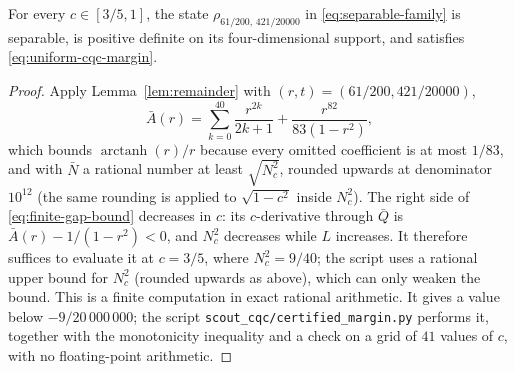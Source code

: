 \begin{lemma}
\label{lem:finite-witness}
 For every $c\in[3/5,1]$, the state
 $\rho_{61/200,\,421/20000}$ in \eqref{eq:separable-family} is
 separable, is positive definite on its four-dimensional support, and
 satisfies \eqref{eq:uniform-cqc-margin}.
\end{lemma}

\begin{proof}
 Apply Lemma~\ref{lem:remainder} with $(r,t)=(61/200,421/20000)$,
 \begin{equation}
  \bar A(r)=\sum_{k=0}^{40}\frac{r^{2k}}{2k+1}
            +\frac{r^{82}}{83(1-r^2)},
  \label{eq:artanh-upper}
 \end{equation}
 which bounds $\operatorname{arctanh}(r)/r$ because every omitted
 coefficient is at most $1/83$, and with $\bar N$ a rational number at
 least $\sqrt{N_c^2}$, rounded upwards at denominator $10^{12}$ (the
 same rounding is applied to $\sqrt{1-c^2}$ inside $N_c^2$).  The right
 side of \eqref{eq:finite-gap-bound} decreases in $c$: its $c$-derivative
 through $\bar Q$ is $\bar A(r)-1/(1-r^2)<0$, and $N_c^2$ decreases
 while $L$ increases.  It therefore suffices to evaluate it at $c=3/5$,
 where $N_c^2=9/40$; the script uses a rational upper bound for
 $N_c^2$ (rounded upwards as above), which can only weaken the bound.  This is a finite computation in exact rational
 arithmetic.  It gives a value below $-9/20\,000\,000$; the script
 \texttt{scout\_cqc/certified\_margin.py} performs it, together with
 the monotonicity inequality and a check on a grid of $41$ values of
 $c$, with no floating-point arithmetic.
\end{proof}


